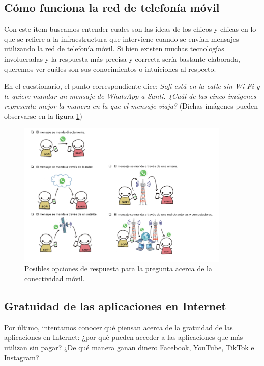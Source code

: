 \subsection{Cómo funciona la red de telefonía móvil}

Con este ítem buscamos entender cuales son las ideas de los chicos y chicas en lo que se refiere a la infraestructura que interviene cuando se envían mensajes utilizando la red de telefonía móvil. Si bien existen muchas tecnologías involucradas y la respuesta más precisa y correcta sería bastante elaborada, queremos ver cuáles son sus conocimientos o intuiciones al respecto.  

En el cuestionario, el punto correspondiente dice: \textit{Sofi está en la calle sin Wi-Fi y le quiere mandar un mensaje de WhatsApp a Santi.  ¿Cuál de las cinco imágenes representa mejor la manera en la que el mensaje viaja?} (Dichas imágenes pueden observarse en la figura \ref{fig:cuest1})

\begin{figure}[h]
    \centering
    \includegraphics[width=0.90\textwidth]{images/1.png}
    \caption{Posibles opciones de respuesta para la pregunta acerca de la conectividad móvil.}
    \label{fig:cuest1}
\end{figure}

\subsection{Gratuidad de las aplicaciones en Internet}

Por último, intentamos conocer qué piensan acerca de la gratuidad de las aplicaciones en Internet: ¿por qué pueden acceder a las aplicaciones que más utilizan sin pagar? ¿De qué manera ganan dinero Facebook, YouTube, TikTok e Instagram?

